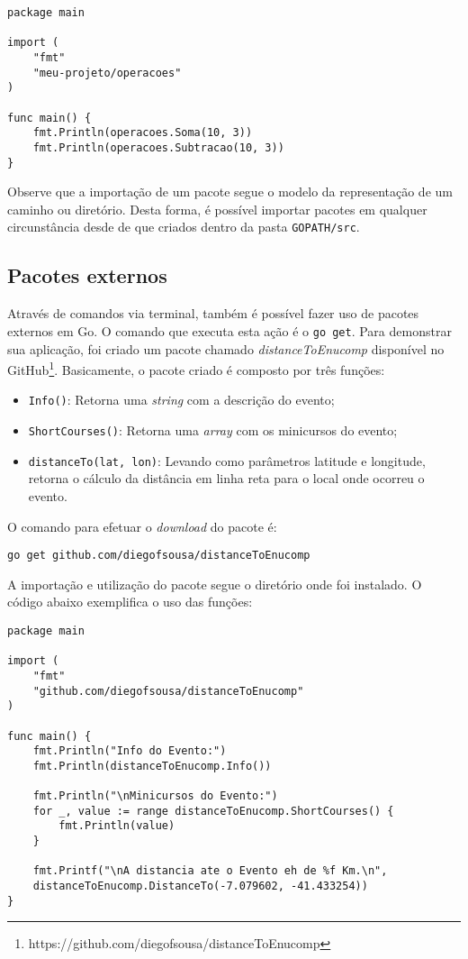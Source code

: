 \documentclass{SBCbookchapter}
\begin{document}
\begin{lstlisting}
package main

import (
	"fmt"
	"meu-projeto/operacoes"
)

func main() {
	fmt.Println(operacoes.Soma(10, 3))
	fmt.Println(operacoes.Subtracao(10, 3))
}
\end{lstlisting}

Observe que a importação de um pacote segue o modelo da representação de um caminho ou diretório. Desta forma, é possível importar pacotes em qualquer circunstância desde de que criados dentro da pasta \texttt{GOPATH/src}.

\subsection{Pacotes externos}

Através de comandos via terminal, também é possível fazer uso de pacotes externos em Go. O comando que executa esta ação é o \texttt{go get}. Para demonstrar sua aplicação, foi criado um pacote chamado \textit{distanceToEnucomp} disponível no GitHub\footnote{https://github.com/diegofsousa/distanceToEnucomp}. Basicamente, o pacote criado é composto por três funções:

\begin{itemize}
	\item \texttt{Info()}: Retorna uma \textit{string} com a descrição do evento;
	\item \texttt{ShortCourses()}: Retorna uma \textit{array} com os minicursos do evento;
	\item \texttt{distanceTo(lat, lon)}: Levando como parâmetros latitude e longitude, retorna o cálculo da distância em linha reta para o local onde ocorreu o evento.
\end{itemize}

O comando para efetuar o \textit{download} do pacote é:

\texttt{go get github.com/diegofsousa/distanceToEnucomp}

A importação e utilização do pacote segue o diretório onde foi instalado. O código abaixo exemplifica o uso das funções:

\begin{lstlisting}
package main

import (
	"fmt"
	"github.com/diegofsousa/distanceToEnucomp"
)

func main() {
	fmt.Println("Info do Evento:")
	fmt.Println(distanceToEnucomp.Info())
	
	fmt.Println("\nMinicursos do Evento:")
	for _, value := range distanceToEnucomp.ShortCourses() {
		fmt.Println(value)
	}
	
	fmt.Printf("\nA distancia ate o Evento eh de %f Km.\n",
	distanceToEnucomp.DistanceTo(-7.079602, -41.433254))
}
\end{lstlisting}
\end{document}
